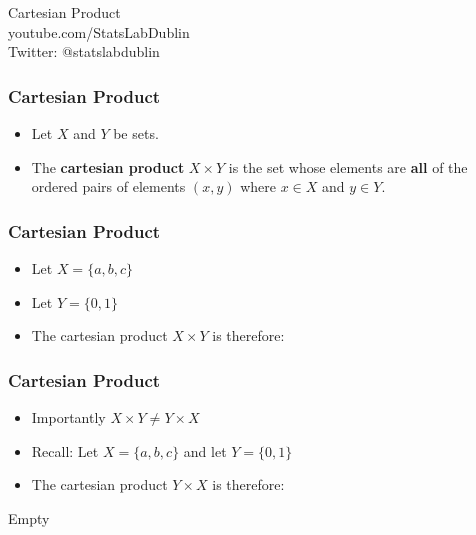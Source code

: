 \documentclass{beamer}
\begin{document}
\begin{frame}
\begin{center}
{ \Huge
Cartesian Product }
\\
\bigskip
{ \Large
youtube.com/StatsLabDublin \\ \vspace{0.2cm} Twitter: @statslabdublin
}
\end{center}
\end{frame}

\begin{frame}
\frametitle{Cartesian Product}
{\LARGE
\begin{itemize}
\item Let $X$ and $Y$ be sets.
\item The \textbf{cartesian product} $X \times Y$ is the set whose elements are \textbf{all} of the ordered pairs of elements $(x,y)$ where $x \in X$ and $y \in Y$.
\end{itemize}
}


\end{frame}


\begin{frame}
\vspace{-1.9cm}
\frametitle{Cartesian Product}
{\LARGE
\begin{itemize}
\item Let $X = \{a,b,c\}$
\item Let $Y = \{0,1\}$ 
\item The cartesian product $X \times Y$ is therefore:
\end{itemize}
}
\end{frame}

\begin{frame}
\vspace{-1.9cm}
\frametitle{Cartesian Product}
{\LARGE
\begin{itemize}
\item Importantly $X \times Y \neq Y \times X$
\item Recall: Let $X = \{a,b,c\}$ and let $Y = \{0,1\}$ 
\item The cartesian product $Y \times X$ is therefore:
\end{itemize}
}



\end{frame}



\begin{frame}
Empty
\end{frame}
\end{document}
